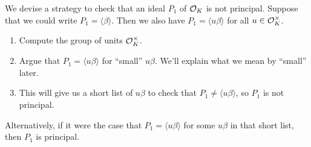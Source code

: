 We devise a strategy to check that an ideal $P_1$ of ${\cal O}_K$ is 
not principal.
Suppose that we could write $P_1 = \langle \beta \rangle$. Then 
we also have $P_1 = \langle u\beta \rangle$ for all $u \in {\cal O}_K^\times$.
\begin{enumerate}[(1)]
    \item Compute the group of units ${\cal O}_K^\times$. 
    \item Argue that $P_1 = \langle u\beta \rangle$ for ``small'' $u\beta$.
    We'll explain what we mean by ``small'' later.
    \item This will give us a short list of $u\beta$ to check that 
    $P_1 \neq \langle u\beta \rangle$, so $P_1$ is not principal.
\end{enumerate}
Alternatively, if it were the case that $P_1 = \langle u\beta \rangle$ for 
some $u\beta$ in that short list, then $P_1$ is principal.